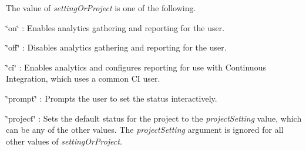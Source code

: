 The value of {\itshape setting\+Or\+Project} is one of the following.
\begin{DoxyItemize}
\item \char`\"{}on\char`\"{} \+: Enables analytics gathering and reporting for the user.
\item \char`\"{}off\char`\"{} \+: Disables analytics gathering and reporting for the user.
\item \char`\"{}ci\char`\"{} \+: Enables analytics and configures reporting for use with Continuous Integration, which uses a common CI user.
\item \char`\"{}prompt\char`\"{} \+: Prompts the user to set the status interactively.
\item \char`\"{}project\char`\"{} \+: Sets the default status for the project to the {\itshape project\+Setting} value, which can be any of the other values. The {\itshape project\+Setting} argument is ignored for all other values of {\itshape setting\+Or\+Project}. 
\end{DoxyItemize}